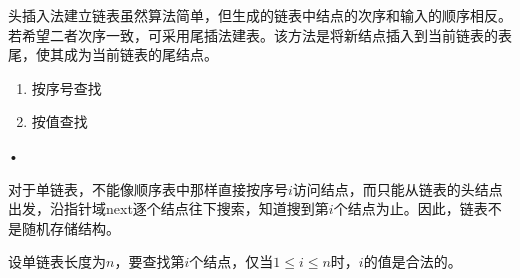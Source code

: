 \begin{frame}[fragile]\ft{\subsecname}

  
\end{frame}

\begin{frame}\ft{\subsecname}
 头插入法建立链表虽然算法简单，但生成的链表中结点的次序和输入的顺序相反。若希望二者次序一致，可采用尾插法建表。该方法是将新结点插入到当前链表的表尾，使其成为当前链表的尾结点。
\end{frame}

\begin{frame}[fragile]\ft{\subsecname}
  

  
\end{frame}

\begin{frame}\ft{\subsecname}
\begin{enumerate}
\item 按序号查找
\item 按值查找
\end{enumerate}•
\end{frame}

\begin{frame}\ft{\subsecname}
 

对于单链表，不能像顺序表中那样直接按序号$i$访问结点，而只能从链表的头结点出发，沿指针域next逐个结点往下搜索，知道搜到第$i$个结点为止。因此，链表不是随机存储结构。

\vspace{0.2in}

设单链表长度为$n$，要查找第$i$个结点，仅当$1\le i \le n$时，$i$的值是合法的。
 
\end{frame}

\begin{frame}[fragile]\ft{\subsecname}



\end{frame}

